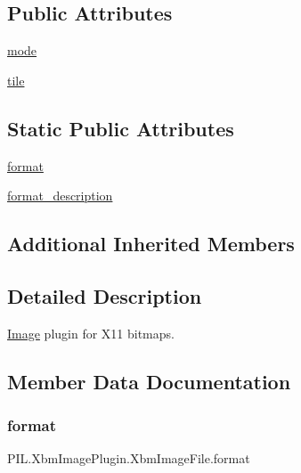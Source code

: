 \subsection*{Public Attributes}
\begin{DoxyCompactItemize}
\item 
\hyperlink{classPIL_1_1XbmImagePlugin_1_1XbmImageFile_a8e53aa0eac1378bc23ae78a937625234}{mode}
\item 
\hyperlink{classPIL_1_1XbmImagePlugin_1_1XbmImageFile_aced65a4199d5f1ae01e19eee4d1b1fba}{tile}
\end{DoxyCompactItemize}
\subsection*{Static Public Attributes}
\begin{DoxyCompactItemize}
\item 
\hyperlink{classPIL_1_1XbmImagePlugin_1_1XbmImageFile_ac16643a01751abc0bde763f67c3da63d}{format}
\item 
\hyperlink{classPIL_1_1XbmImagePlugin_1_1XbmImageFile_af52741b9a18a56fc923bcda72a9cd279}{format\+\_\+description}
\end{DoxyCompactItemize}
\subsection*{Additional Inherited Members}


\subsection{Detailed Description}
\hyperlink{namespacePIL_1_1Image}{Image} plugin for X11 bitmaps. 



\subsection{Member Data Documentation}
\mbox{\label{classPIL_1_1XbmImagePlugin_1_1XbmImageFile_ac16643a01751abc0bde763f67c3da63d}} 
\subsubsection{\texorpdfstring{format}{format}}
{\footnotesize\ttfamily P\+I\+L.\+Xbm\+Image\+Plugin.\+Xbm\+Image\+File.\+format\hspace{0.3cm}{\ttfamily [static]}}

